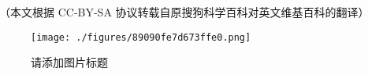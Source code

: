 
（本文根据 CC-BY-SA 协议转载自原搜狗科学百科对英文维基百科的翻译）

\begin{figure}[ht]
\centering
\texttt{[image: ./figures/89090fe7d673ffe0.png]}
\caption{请添加图片标题} \label{fig_OMB_1}
\end{figure}

